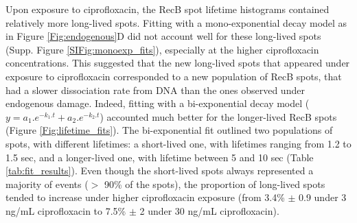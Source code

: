 Upon exposure to ciprofloxacin, the RecB spot lifetime histograms contained relatively more long-lived spots. Fitting with a mono-exponential decay model as in Figure \ref{Fig:endogenous}D did not account well for these long-lived spots (Supp. Figure \ref{SIFig:monoexp_fits}), especially at the higher ciprofloxacin concentrations. This suggested that the new long-lived spots that appeared under exposure to ciprofloxacin corresponded to a new population of RecB spots, that had a slower dissociation rate from DNA than the ones observed under endogenous damage. Indeed, fitting with a bi-exponential decay model ($y = a_1.e^{-k_1.t} + a_2.e^{-k_2.t}$) accounted much better for the longer-lived RecB spots (Figure \ref{Fig:lifetime_fits}). The bi-exponential fit outlined two populations of spots, with different lifetimes: a short-lived one, with lifetimes ranging from 1.2 to 1.5 sec, and a longer-lived one, with lifetime between 5 and 10 sec (Table \ref{tab:fit_results}). Even though the short-lived spots always represented a majority of events ($>$ 90\% of the spots), the proportion of long-lived spots tended to increase under higher ciprofloxacin exposure (from 3.4\% $\pm$ 0.9 under 3 ng/mL ciprofloxacin to 7.5\% $\pm$ 2 under 30 ng/mL ciprofloxacin).

